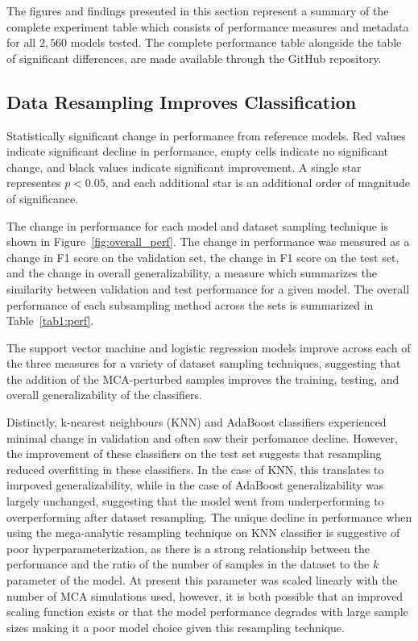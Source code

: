 \documentclass[10pt]{SelfArx} %
\begin{document}
The figures and findings presented in this section represent a summary of the complete experiment table which consists
of performance measures and metadata for all $2,560$ models tested. The complete performance table alongside the table
of significant differences, are made available through the GitHub repository.

\subsection*{Data Resampling Improves Classification}

\begin{table}[tbh]
\centering
\caption{Statistically significant change in performance from reference models. Red values indicate significant
decline in performance, empty cells indicate no significant change, and black values indicate significant improvement.
A single star representes $p < 0.05$, and each additional star is an additional order of magnitude of significance.}
\label{tab1:perf}
\small

\end{table}

The change in performance for each model and dataset sampling technique is shown in Figure~\ref{fig:overall_perf}. The
change in performance was measured as a change in F1 score on the validation set, the change in F1 score on the test
set, and the change in overall generalizability, a measure which summarizes the similarity between validation and test
performance for a given model. The overall performance of each subsampling method across the sets is summarized in
Table~\ref{tab1:perf}.

The support vector machine and logistic regression models improve across each of the three measures for a variety of
dataset sampling techniques, suggesting that the addition of the MCA-perturbed samples improves the training, testing,
and overall generalizability of the classifiers.

Distinctly, k-nearest neighbours (KNN) and AdaBoost classifiers experienced minimal change in validation and often saw
their perfomance decline. However, the improvement of these classifiers on the test set suggests that resampling
reduced overfitting in these classifiers. In the case of KNN, this translates to imrpoved generalizability, while in
the case of AdaBoost generalizability was largely unchanged, suggesting that the model went from underperforming to
overperforming after dataset resampling. The unique decline in performance when using the mega-analytic resampling
technique on KNN classifier is suggestive of poor hyperparameterization, as there is a strong relationship between the
performance and the ratio of the number of samples in the dataset to the $k$ parameter of the model. At present this
parameter was scaled linearly with the number of MCA simulations used, however, it is both possible that an improved
scaling function exists or that the model performance degrades with large sample sizes making it a poor model choice
given this resampling technique.
\end{document}
